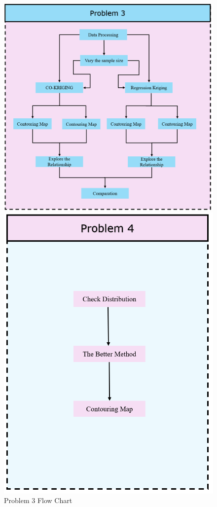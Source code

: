 \documentclass{swmcmthesis}
\begin{document}
\begin{figure}[h!t]
	\centering
	\begin{minipage}[t]{0.5\textwidth}
		\centering
		\includegraphics[width=\textwidth]{Problem 3.png}
		\caption{Problem 3 Flow Chart}
	\end{minipage}
	\hfill
	\begin{minipage}[t]{0.4\textwidth}
		\centering
		\includegraphics[width=\textwidth]{Problem 4.png}

\end{minipage}
\end{figure}
\end{document}
